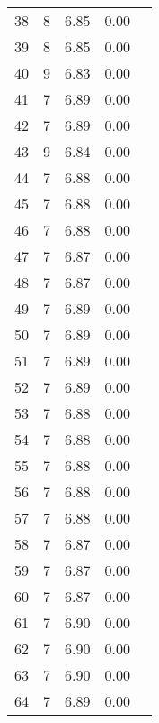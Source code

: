 \documentclass{article}
\begin{document}
\begin{center}
\begin{longtable}{l | c c c c }
38 & 8 & 6.85 & 0.00 \\
39 & 8 & 6.85 & 0.00 \\
40 & 9 & 6.83 & 0.00 \\
41 & 7 & 6.89 & 0.00 \\
42 & 7 & 6.89 & 0.00 \\
43 & 9 & 6.84 & 0.00 \\
44 & 7 & 6.88 & 0.00 \\
45 & 7 & 6.88 & 0.00 \\
46 & 7 & 6.88 & 0.00 \\
47 & 7 & 6.87 & 0.00 \\
48 & 7 & 6.87 & 0.00 \\
49 & 7 & 6.89 & 0.00 \\
50 & 7 & 6.89 & 0.00 \\
51 & 7 & 6.89 & 0.00 \\
52 & 7 & 6.89 & 0.00 \\
53 & 7 & 6.88 & 0.00 \\
54 & 7 & 6.88 & 0.00 \\
55 & 7 & 6.88 & 0.00 \\
56 & 7 & 6.88 & 0.00 \\
57 & 7 & 6.88 & 0.00 \\
58 & 7 & 6.87 & 0.00 \\
59 & 7 & 6.87 & 0.00 \\
60 & 7 & 6.87 & 0.00 \\
61 & 7 & 6.90 & 0.00 \\
62 & 7 & 6.90 & 0.00 \\
63 & 7 & 6.90 & 0.00 \\
64 & 7 & 6.89 & 0.00 \\
\end{longtable}
\end{center}
\end{document}
